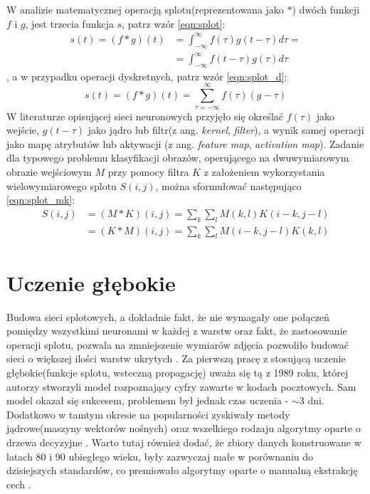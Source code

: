 W analizie matematycznej operacją splotu(reprezentowana jako $*$) dwóch funkcji $f$ i $g$, jest trzecia funkcja $s$, patrz wzór \ref{eqn:splot}:
\begin{equation}
	\begin{split}
		s(t) = (f * g)(t) & = \int_{-\infty}^{\infty}f(\tau)g(t-\tau)d\tau =\\
						  & =\int_{-\infty}^{\infty}f(t-\tau)g(\tau)d\tau
	\end{split}
	\label{eqn:splot}
\end{equation}
, a w przypadku operacji dyskretnych, patrz wzór \ref{eqn:splot_d}:
\begin{equation}
	s(t)=(f*g)(t)=\sum_{\tau = -\infty}^{\infty}f(\tau)(g-\tau)
	\label{eqn:splot_d}
\end{equation}
W literaturze opisującej sieci neuronowych przyjęło się określać $f(\tau)$ jako wejście, $g(t - \tau)$ jako jądro lub filtr(z ang. \textit{kernel}, \textit{filter}), a wynik samej operacji jako mapę atrybutów lub aktywacji (z ang. \textit{feature map}, \textit{activation map})\cite{piczak}. Zadanie dla typowego problemu klasyfikacji obrazów, operującego na dwuwymiarowym obrazie wejściowym $M$ przy pomocy filtra $K$ z założeniem wykorzystania wielowymiarowego splotu $S(i, j)$, można sformułować następująco \ref{eqn:splot_mk}:
\begin{equation}
	\begin{split}
	S(i, j) & = (M*K)(i,j)=\sum_{k}^{}\sum_{l}^{}M(k,l)K(i-k,j-l) \\
		    & = (K*M)(i,j)=\sum_{k}^{}\sum_{l}^{}M(i-k,j-l)K(k,l)
	\end{split}
	\label{eqn:splot_mk}
\end{equation}

\section{Uczenie głębokie}

Budowa sieci splotowych, a dokładnie fakt, że nie wymagały one połączeń pomiędzy wszystkimi neuronami w każdej z warstw oraz fakt, że zastosowanie operacji splotu, pozwala na zmniejszenie wymiarów zdjęcia pozwoliło budować sieci o większej ilości warstw ukrytych \cite{python_ml}. Za pierwszą pracę z stosującą uczenie głębokie(funkcje splotu, wsteczną propagację) uważa się tą z 1989 roku, której autorzy stworzyli model rozpoznający cyfry zawarte w kodach pocztowych\cite{lecun}. Sam model okazał się sukcesem, problemem był jednak czas uczenia - $\sim$3 dni. Dodatkowo w tamtym okresie na popularności zyskiwały metody jądrowe(maszyny wektorów nośnych) oraz wszelkiego rodzaju algorytmy oparte o drzewa decyzyjne \cite{hands_on}. Warto tutaj również dodać, że zbiory danych konstruowane w latach 80 i 90 ubiegłego wieku, były zazwyczaj małe w porównaniu do dzisiejszych standardów, co premiowało algorytmy oparte o manualną ekstrakcję cech \cite{deep}. \\

